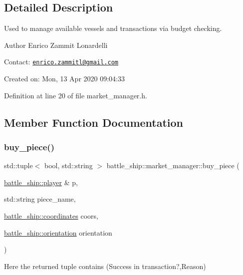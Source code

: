 \subsection{Detailed Description}
Used to manage available vessels and transactions via budget checking. 

\begin{DoxyAuthor}{Author}
Enrico Zammit Lonardelli
\end{DoxyAuthor}
Contact\+: \href{mailto:enrico.zammitl@gmail.com}{\tt enrico.\+zammitl@gmail.\+com}

Created on\+: Mon, 13 Apr 2020 09\+:04\+:33 

Definition at line 20 of file market\+\_\+manager.\+h.



\subsection{Member Function Documentation}
\mbox{\label{classbattle__ship_1_1market__manager_afc7b9ed406cf2f728e658cec16232408}} 
\subsubsection{\texorpdfstring{buy\+\_\+piece()}{buy\_piece()}}
{\footnotesize\ttfamily std\+::tuple$<$ bool, std\+::string $>$ battle\+\_\+ship\+::market\+\_\+manager\+::buy\+\_\+piece (\begin{DoxyParamCaption}\item[{\hyperlink{classbattle__ship_1_1player}{battle\+\_\+ship\+::player} \&}]{p,  }\item[{std\+::string}]{piece\+\_\+name,  }\item[{\hyperlink{structbattle__ship_1_1coordinates}{battle\+\_\+ship\+::coordinates}}]{coors,  }\item[{\hyperlink{namespacebattle__ship_aed87488f0a73f0d0679fe343fb61c784}{battle\+\_\+ship\+::orientation}}]{orientation }\end{DoxyParamCaption})\hspace{0.3cm}{\ttfamily [static]}}



Here the returned tuple contains (Success in transaction?,Reason) 



